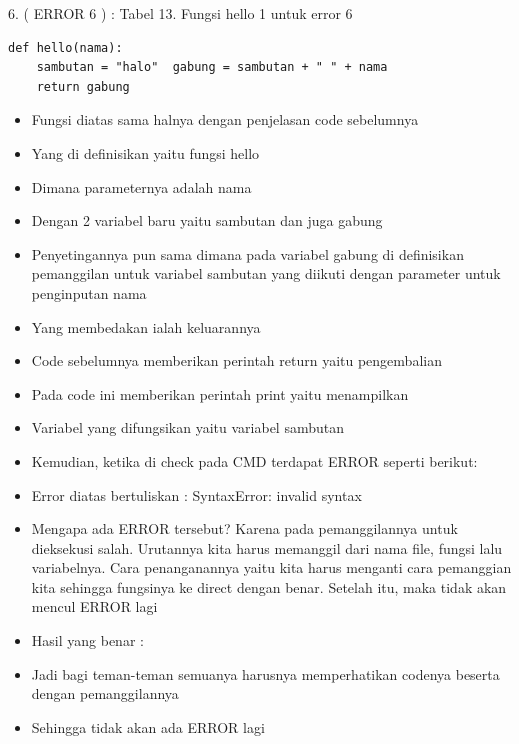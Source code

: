 6. ( ERROR 6 ) : 
Tabel 13. Fungsi hello 1 untuk error 6  
\begin{verbatim}
def hello(nama):
	sambutan = "halo"  gabung = sambutan + " " + nama 
	return gabung
\end{verbatim}
\begin{itemize}
\item Fungsi diatas sama halnya dengan penjelasan code sebelumnya 
\item Yang di definisikan yaitu fungsi hello 
\item Dimana parameternya adalah nama 
\item Dengan 2 variabel baru yaitu sambutan dan juga gabung 
\item Penyetingannya pun sama dimana pada variabel gabung di definisikan pemanggilan untuk variabel sambutan yang diikuti dengan parameter untuk penginputan nama 
\item Yang membedakan ialah keluarannya 
\item Code sebelumnya memberikan perintah return yaitu pengembalian 
\item Pada code ini memberikan perintah print yaitu menampilkan 
\item Variabel yang difungsikan yaitu variabel sambutan 
\item Kemudian, ketika di check pada CMD terdapat ERROR seperti berikut: 
\item Error diatas bertuliskan : SyntaxError: invalid syntax 
\item Mengapa ada ERROR tersebut? Karena pada pemanggilannya untuk dieksekusi salah. Urutannya kita harus memanggil dari nama file, fungsi lalu variabelnya. Cara penanganannya yaitu kita harus menganti cara pemanggian kita sehingga fungsinya ke direct dengan benar. Setelah itu, maka tidak akan mencul ERROR lagi 
\item Hasil yang benar : 
\item Jadi bagi teman-teman semuanya harusnya memperhatikan codenya beserta dengan pemanggilannya 
\item Sehingga tidak akan ada ERROR lagi 
\end{itemize}

